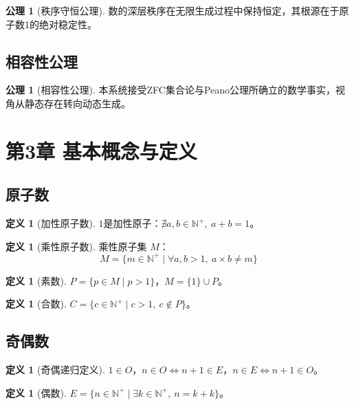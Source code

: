 \documentclass[12pt]{article}
\theoremstyle{definition}
\newtheorem{definition}[theorem]{定义}
\newtheorem{axiom}[theorem]{公理}
\newcommand{\N}{\mathbb{N}}
\begin{document}
\begin{axiom}[秩序守恒公理]
数的深层秩序在无限生成过程中保持恒定，其根源在于原子数1的绝对稳定性。
\end{axiom}

\subsection{相容性公理}

\begin{axiom}[相容性公理]
本系统接受ZFC集合论与Peano公理所确立的数学事实，视角从静态存在转向动态生成。
\end{axiom}

\section{第3章 基本概念与定义}

\subsection{原子数}

\begin{definition}[加性原子数]
\(1\)是加性原子：\(\nexists a,b \in \N^+,\ a+b=1\)。
\end{definition}

\begin{definition}[乘性原子数]
乘性原子集 \(M\)：
\[
M = \{m \in \N^+ \mid \forall a,b > 1,\ a \times b \neq m\}
\]
\end{definition}

\begin{definition}[素数]
\(P = \{p \in M \mid p > 1\}\)，\(M = \{1\} \cup P\)。
\end{definition}

\begin{definition}[合数]
\(C = \{c \in \N^+ \mid c > 1,\ c \notin P\}\)。
\end{definition}

\subsection{奇偶数}

\begin{definition}[奇偶递归定义]
\(1 \in O\)，\(n \in O \iff n+1 \in E\)，\(n \in E \iff n+1 \in O\)。
\end{definition}

\begin{definition}[偶数]
\(E = \{n \in \N^+ \mid \exists k \in \N^+,\ n = k+k\}\)。
\end{definition}
\end{document}
